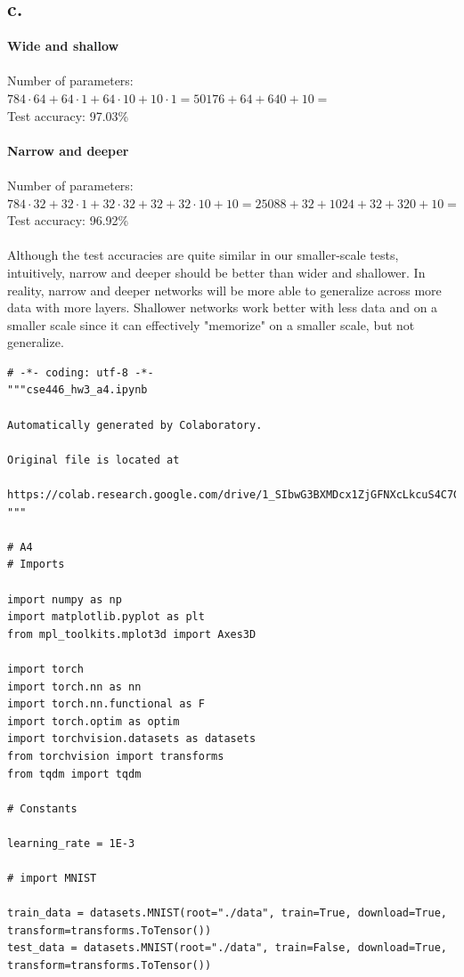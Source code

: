 \documentclass{article}
\newcommand{\1}{\mathbf{1}}
\begin{document}
{\subsection*{c.}

\textbf{Wide and shallow} \\ \\
Number of parameters: $784 \cdot 64 + 64 \cdot 1 + 64 \cdot 10 + 10 \cdot 1 = 50176 + 64 + 640 + 10 = $   \\
Test accuracy: 97.03\% \\ \\
\textbf{Narrow and deeper} \\ \\
Number of parameters: $784 \cdot 32 + 32 \cdot 1 + 32 \cdot 32 + 32 + 32 \cdot 10 + 10 = 25088 + 32 + 1024 + 32 + 320 + 10 = $  \\
Test accuracy: 96.92\% \\ \\
Although the test accuracies are quite similar in our smaller-scale tests, intuitively, narrow and deeper should be better than wider and shallower. In reality, narrow and deeper networks will be more able to generalize across more data with more layers. Shallower networks work better with less data and on a smaller scale since it can effectively "memorize" on a smaller scale, but not generalize.

\newpage

\begin{verbatim}
# -*- coding: utf-8 -*-
"""cse446_hw3_a4.ipynb

Automatically generated by Colaboratory.

Original file is located at
    https://colab.research.google.com/drive/1_SIbwG3BXMDcx1ZjGFNXcLkcuS4C7G_O
"""

# A4
# Imports

import numpy as np
import matplotlib.pyplot as plt
from mpl_toolkits.mplot3d import Axes3D

import torch
import torch.nn as nn
import torch.nn.functional as F
import torch.optim as optim
import torchvision.datasets as datasets
from torchvision import transforms
from tqdm import tqdm

# Constants

learning_rate = 1E-3

# import MNIST

train_data = datasets.MNIST(root="./data", train=True, download=True, transform=transforms.ToTensor())
test_data = datasets.MNIST(root="./data", train=False, download=True, transform=transforms.ToTensor())


\end{verbatim}}
\end{document}
